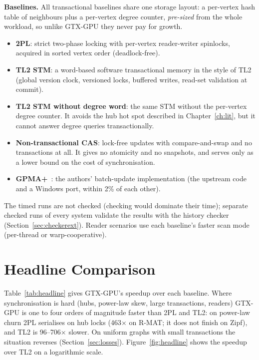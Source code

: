 \documentclass[11pt,a4paper,oneside]{report}
\newcommand{\sys}{GTX-GPU}
\begin{document}
\textbf{Baselines.} All transactional baselines share one storage layout: a per-vertex hash table of neighbours plus a
per-vertex degree counter, \emph{pre-sized} from the whole workload, so unlike \sys{} they never pay for growth.
\begin{itemize}
\item \textbf{2PL}: strict two-phase locking with per-vertex reader-writer spinlocks, acquired in sorted vertex order
  (deadlock-free).
\item \textbf{TL2 STM}: a word-based software transactional memory in the style of TL2~\cite{tl2} (global version clock,
  versioned locks, buffered writes, read-set validation at commit).
\item \textbf{TL2 STM without degree word}: the same STM without the per-vertex degree counter. It avoids the hub hot
  spot described in Chapter~\ref{ch:lit}, but it cannot answer degree queries transactionally.
\item \textbf{Non-transactional CAS}: lock-free updates with compare-and-swap and no transactions at all. It gives no
  atomicity and no snapshots, and serves only as a lower bound on the cost of synchronisation.
\item \textbf{GPMA+}~\cite{gpma}: the authors' batch-update implementation (the upstream code and a Windows port, within
  2\% of each other).
\end{itemize}
The timed runs are not checked (checking would dominate their time); separate checked runs of every system validate
the results with the history checker (Section~\ref{sec:checkerext}). Reader scenarios use each baseline's faster scan
mode (per-thread or warp-cooperative).

\section{Headline Comparison}
\label{sec:headline}
Table~\ref{tab:headline} gives \sys{}'s speedup over each baseline. Where synchronisation is hard (hubs, power-law
skew, large transactions, readers) \sys{} is one to four orders of magnitude faster than 2PL and TL2: on power-law
churn 2PL serialises on hub locks (463$\times$ on R-MAT; it does not finish on Zipf), and TL2 is 96--706$\times$
slower. On uniform graphs with small transactions the situation reverses (Section~\ref{sec:losses}).
Figure~\ref{fig:headline} shows the speedup over TL2 on a logarithmic scale.
\end{document}

